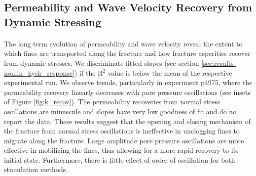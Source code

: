 \documentclass[letterpaper,10pt]{article}
\begin{document}
	\subsection{Permeability and Wave Velocity Recovery from Dynamic Stressing}
	\paragraph{}
	The long term evolution of permeability and wave velocity reveal the extent to which fines are transported along the fracture and how fracture asperities recover from dynamic stresses. We discriminate fitted slopes (see section \ref{sec:results-nonlin_hydr_response}) if the R$^2$ value is below the mean of the respective experimental run. We observe trends, particularly in experiment p4975, where the permeability recovery linearly decreases with pore pressure oscillations (see insets of Figure \ref{fig:k_recov}). The permeability recoveries from normal stress oscillations are minuscule and slopes have very low goodness of fit and do no report the data. These results suggest that the opening and closing mechanism of the fracture from normal stress oscillations is ineffective in unclogging fines to migrate along the fracture. Large amplitude pore pressure oscillations are more effective in mobilizing the fines, thus allowing for a more rapid recovery to its initial state. Furthermore, there is little effect of order of oscillation for both stimulation methods. 
\end{document}
